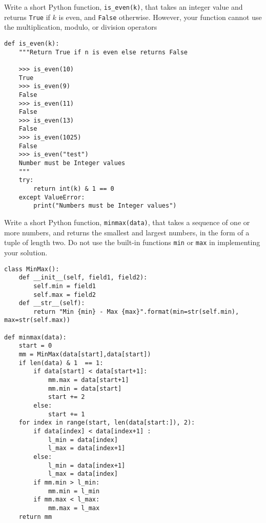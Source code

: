  \label{sssec:ex1_2}

Write a short Python function, \texttt{is_even(k)}, that takes an integer value and returns \texttt{True} if $k$ is even, and \texttt{False} otherwise. However, your function cannot use the multiplication, modulo, or division operators

\begin{lstlisting}[title=Exercise R-1.2]
def is_even(k):
    """Return True if n is even else returns False

    >>> is_even(10)
    True
    >>> is_even(9)
    False
    >>> is_even(11)
    False
    >>> is_even(13)
    False
    >>> is_even(1025)
    False
    >>> is_even("test")
    Number must be Integer values
    """
    try:
        return int(k) & 1 == 0
    except ValueError:
        print("Numbers must be Integer values")
\end{lstlisting}

 \label{sssec:ex1_3}

Write a short Python function, \texttt{minmax(data)}, that takes a sequence of one or more numbers, and returns the smallest and largest numbers, in the form of a tuple of length two. Do not use the built-in functions \texttt{min} or \texttt{max} in implementing your solution.

\begin{lstlisting}
class MinMax():
    def __init__(self, field1, field2):
        self.min = field1
        self.max = field2
    def __str__(self):
        return "Min {min} - Max {max}".format(min=str(self.min), max=str(self.max))

def minmax(data):
    start = 0
    mm = MinMax(data[start],data[start])
    if len(data) & 1  == 1:
        if data[start] < data[start+1]:
            mm.max = data[start+1]
            mm.min = data[start]
            start += 2
        else:
            start += 1
    for index in range(start, len(data[start:]), 2):
        if data[index] < data[index+1] :
            l_min = data[index]
            l_max = data[index+1]
        else:
            l_min = data[index+1]
            l_max = data[index]
        if mm.min > l_min:
            mm.min = l_min
        if mm.max < l_max:
            mm.max = l_max
    return mm
\end{lstlisting}